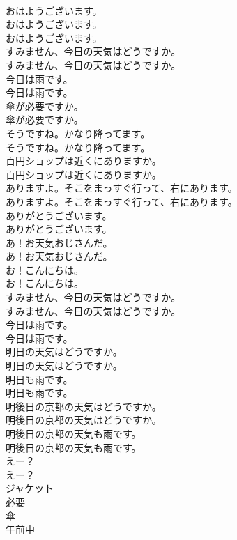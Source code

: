 \documentclass[8pt]{extreport}
\begin{document}
\begin{CJK}{UTF8}{min}
\\	おはようございます。 
\\	おはようございます。	
\\	おはようございます。 
\\	すみません、今日の天気はどうですか。	
\\	すみません、今日の天気はどうですか。 
\\	今日は雨です。	
\\	今日は雨です。 
\\	傘が必要ですか。	
\\	傘が必要ですか。 
\\	そうですね。かなり降ってます。	
\\	そうですね。かなり降ってます。 
\\	百円ショップは近くにありますか。	
\\	百円ショップは近くにありますか。 
\\	ありますよ。そこをまっすぐ行って、右にあります。	
\\	ありますよ。そこをまっすぐ行って、右にあります。 
\\	ありがとうございます。	
\\	ありがとうございます。 
\\	あ！お天気おじさんだ。	
\\	あ！お天気おじさんだ。 
\\	お！こんにちは。	
\\	お！こんにちは。 
\\	すみません、今日の天気はどうですか。	
\\	すみません、今日の天気はどうですか。 
\\	今日は雨です。	
\\	今日は雨です。 
\\	明日の天気はどうですか。	
\\	明日の天気はどうですか。 
\\	明日も雨です。	
\\	明日も雨です。 
\\	明後日の京都の天気はどうですか。	
\\	明後日の京都の天気はどうですか。 
\\	明後日の京都の天気も雨です。	
\\	明後日の京都の天気も雨です。 
\\	えー？	
\\	えー？ 
\\	ジャケット
\\	必要
\\	傘
\\	午前中

\end{CJK}
\end{document}
